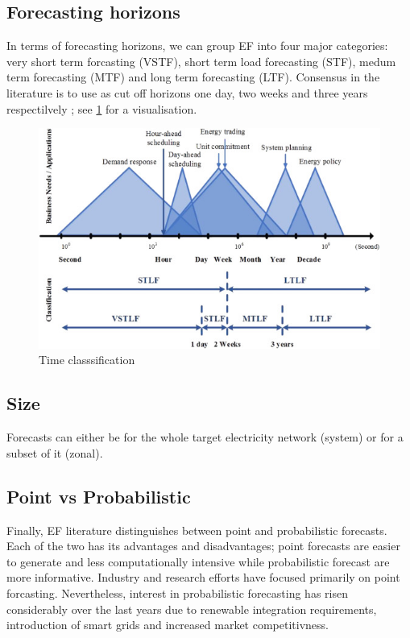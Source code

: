 \subsection{Forecasting horizons}\label{cls_time}
In terms of forecasting horizons, we can group EF into four major categories: very short term forcasting (VSTF), short term load forecasting (STF), medum term forecasting (MTF) and long term forecasting (LTF). Consensus in the literature is to use as cut off horizons one day, two weeks and three years respectilvely \cite{hong_phd}; see \ref{fig:time} for a visualisation. 
\begin{figure}
  \includegraphics[width=\textwidth]{images/time.jpg}
  \caption{Time classsification \cite{prob_elf}}
  \label{fig:time}
\end{figure}


\subsection{Size}
Forecasts can either be for the whole target electricity network (system) or for a subset of it (zonal).

\subsection{Point vs Probabilistic}\label{cls_pp}
Finally, EF literature distinguishes between point and probabilistic forecasts. Each of the two has its advantages and disadvantages; point forecasts are easier to generate and less computationally intensive while probabilistic forecast are more informative. Industry and research efforts have focused primarily on point forcasting. Nevertheless, interest in probabilistic forecasting has risen considerably over the last years due to renewable integration requirements, introduction of smart grids and increased market competitivness.
